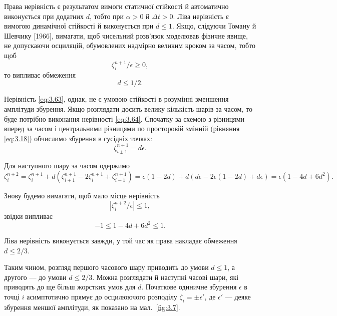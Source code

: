 Права нерівність є результатом вимоги статичної стійкості й автоматично виконується при додатних $d$, тобто при $\alpha > 0$ й $\Delta t > 0$. Ліва нерівність є вимогою динамічної стійкості й виконується при $d \le 1$. Якщо, слідуючи Томану й Шевчику [1966], вимагати, щоб чисельний розв'язок моделював фізичне явище, не допускаючи осциляцій, обумовлених надмірно великим кроком за часом, тобто щоб
\begin{equation}
    \label{eq:3.63}
    \zeta_i^{n + 1} / \epsilon \ge 0 ,
\end{equation}
то випливає обмеження
\begin{equation}
    \label{eq:3.64}
    d \le 1/2.
\end{equation}

Нерівність \eqref{eq:3.63}, однак, не є умовою стійкості в розумінні зменшення амплітуди збурення. Якщо розглядати досить велику кількість шарів за часом, то буде потрібно виконання нерівності \eqref{eq:3.64}. Спочатку за схемою з різницями вперед за часом і центральними різницями по просторовій змінній (рівняння \eqref{eq:3.18}) обчислимо збурення в сусідніх точках:
\begin{equation}
    \label{eq:3.65}
    \zeta_{i \pm 1}^{n + 1} = d \epsilon.
\end{equation}

Для наступного шару за часом одержимо
\begin{equation}
    \label{eq:3.66}
    \zeta_i^{n + 2} = \zeta_i^{n + 1} + d ( \zeta_{i + 1}^{n + 1} - 2 \zeta_i^{n + 1} + \zeta_{i - 1}^{n + 1}) = \epsilon (1 - 2 d) + d (d \epsilon - 2 \epsilon(1 - 2d) + d \epsilon) = \epsilon (1 - 4 d + 6 d^2).
\end{equation}

Знову будемо вимагати, щоб мало місце нерівність
\begin{equation}
    \label{eq:3.67}
    |\zeta_i^{n + 2} / \epsilon | \le 1,
\end{equation}
звідки випливає
\begin{equation}
    \label{eq:3.68}
    -1 \le 1 - 4 d + 6 d^2 \le 1.
\end{equation}

Ліва нерівність виконується завжди, у той час як права накладає обмеження $d \le 2 / 3$. \medskip

Таким чином, розгляд першого часового шару приводить до умови $d \le 1$, а другого --- до умови $d \le 2 / 3$. Можна розглядати й наступні часові шари, які приводять до ще більш жорстких умов для $d$. Початкове одиничне збурення $\epsilon$ в точці $i$ асимптотично прямує до осцилюючого розподілу $\zeta_i = \pm \epsilon'$, де $\epsilon'$ --- деяке збурення меншої амплітуди, як показано на мал.~\ref{fig:3.7}.

